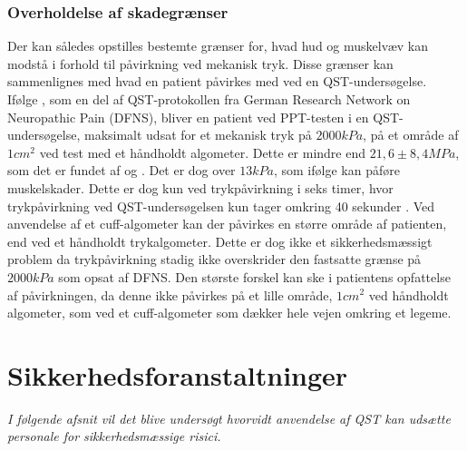 \subsubsection{Overholdelse af skadegrænser}
Der kan således opstilles bestemte grænser for, hvad hud og muskelvæv kan modstå i forhold til påvirkning ved mekanisk tryk. Disse grænser kan sammenlignes med hvad en patient påvirkes med ved en QST-undersøgelse. \\
Ifølge , som en del af QST-protokollen fra German Research Network on Neuropathic Pain (DFNS), bliver en patient ved PPT-testen i en QST-undersøgelse, maksimalt udsat for et mekanisk tryk på $2000 kPa$, på et område af $1 cm^{2}$ ved test med et håndholdt algometer. Dette er mindre end $21,6 \pm 8,4 MPa$, som det er fundet af  og . Det er dog over $13 kPa$, som ifølge  kan påføre muskelskader. Dette er dog kun ved trykpåvirkning i seks timer, hvor trykpåvirkning ved QST-undersøgelsen kun tager omkring 40 sekunder \cite{rolke2006}. Ved anvendelse af et cuff-algometer kan der påvirkes en større område af patienten, end ved et håndholdt trykalgometer. Dette er dog ikke et sikkerhedsmæssigt problem da trykpåvirkning stadig ikke overskrider den fastsatte grænse på $2000 kPa$ som opsat af DFNS. Den største forskel kan ske i patientens opfattelse af påvirkningen, da denne ikke påvirkes på et lille område, $1 cm^{2}$ ved håndholdt algometer, som ved et cuff-algometer som dækker hele vejen omkring et legeme. %



\section{Sikkerhedsforanstaltninger}
\textit{I følgende afsnit vil det blive undersøgt hvorvidt anvendelse af QST kan udsætte personale for sikkerhedsmæssige risici.}

